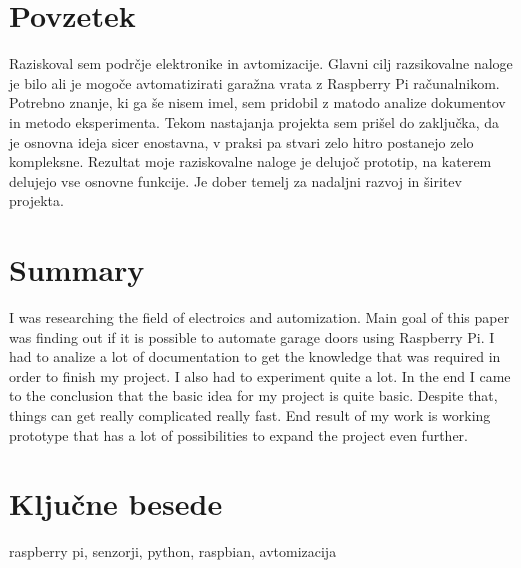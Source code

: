 \documentclass[11pt]{article}
\begin{document}
\newpage
\thispagestyle{empty}
\section*{Povzetek}
Raziskoval sem podrčje elektronike in avtomizacije. Glavni cilj razsikovalne naloge je bilo ali je mogoče avtomatizirati garažna vrata z Raspberry Pi računalnikom. Potrebno znanje, ki ga še nisem imel, sem pridobil z matodo analize dokumentov in metodo eksperimenta. Tekom nastajanja projekta sem prišel do zaključka, da je osnovna ideja sicer enostavna, v praksi pa stvari zelo hitro postanejo zelo kompleksne. Rezultat moje raziskovalne naloge je delujoč prototip, na katerem delujejo vse osnovne funkcije. Je dober temelj za nadaljni razvoj in širitev projekta.
\section*{Summary}
I was researching the field of electroics and automization. Main goal of this paper was finding out if it is possible to automate garage doors using Raspberry Pi. I had to analize a lot of documentation to get the knowledge that was required in order to finish my project. I also had to experiment quite a lot. In the end I came to the conclusion that the basic idea for my project is quite basic. Despite that, things can get really complicated really fast. End result of my work is working prototype that has a lot of possibilities to expand the project even further.
\section*{Ključne besede}
raspberry pi, senzorji, python, raspbian, avtomizacija

\renewcommand{\baselinestretch}{0.90}\normalsize
\newpage
{}
\thispagestyle{empty}
\tableofcontents
\listoffigures
\renewcommand{\baselinestretch}{1.0}\normalsize
\newpage

\pagestyle{fancy}
\fancyhead{}
\fancyfoot{}
\fancyfoot[C]{\thepage}
\end{document}
